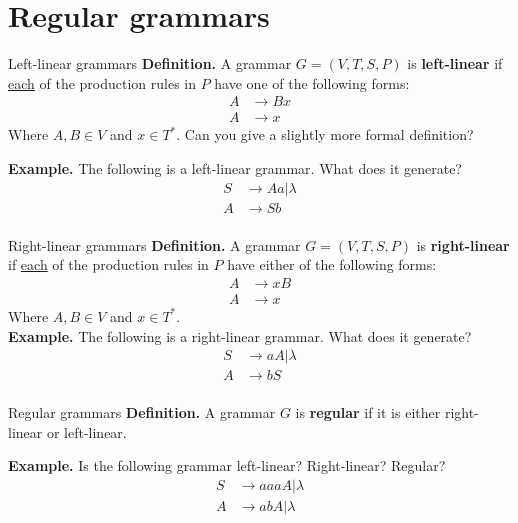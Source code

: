 \documentclass[10pt]{beamer}
\begin{document}
\section{Regular grammars}

\begin{frame}{Left-linear grammars}
    \textbf{Definition.} A grammar $G = (V,T,S,P)$ is \textbf{left-linear} if \underline{each} of the production rules in $P$ have one of the following forms:
    \begin{align*}
        A & \rightarrow Bx \\
        A & \rightarrow x
    \end{align*}
    Where $A,B \in V$ and $x \in T^*$. Can you give a slightly more formal definition?

    \textbf{Example.} The following is a left-linear grammar. What does it generate?
    \begin{align*}
        S & \rightarrow Aa | \lambda \\
        A & \rightarrow Sb           \\
    \end{align*}
\end{frame}

\begin{frame}{Right-linear grammars}
    \textbf{Definition.} A grammar $G = (V,T,S,P)$ is \textbf{right-linear} if \underline{each} of the production rules in $P$ have either of the following forms:
    \begin{align*}
        A & \rightarrow xB \\
        A & \rightarrow x
    \end{align*}
    Where $A,B \in V$ and $x \in T^*$.\\

    \textbf{Example.} The following is a right-linear grammar. What does it generate?
    \begin{align*}
        S & \rightarrow aA | \lambda \\
        A & \rightarrow bS           \\
    \end{align*}
\end{frame}

\begin{frame}{Regular grammars}
    \textbf{Definition.} A grammar $G$ is \textbf{regular} if it is either right-linear or left-linear.

    \textbf{Example.} Is the following grammar left-linear? Right-linear? Regular?
    \begin{align*}
        S & \rightarrow aaaA | \lambda \\
        A & \rightarrow abA | \lambda  \\
    \end{align*}
\end{frame}
\end{document}
